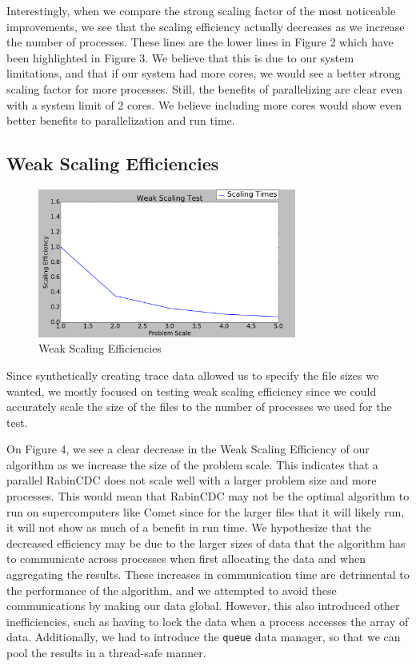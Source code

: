 \documentclass{acmtog} %
\begin{document}
	Interestingly, when we compare the strong scaling factor of the most noticeable improvements, we see that the scaling efficiency actually decreases as we increase the number of processes. These lines are the lower lines in Figure 2 which have been highlighted in Figure 3. We believe that this is due to our system limitations, and that if our system had more cores, we would see a better strong scaling factor for more processes. Still, the benefits of parallelizing are clear even with a system limit of 2 cores. We believe including more cores would show even better benefits to parallelization and run time. 
	
	\subsection{Weak Scaling Efficiencies}
		\begin{figure}
			\centerline{\includegraphics[width=8.5cm]{img/WeakScalingOnly}}
			\caption{Weak Scaling Efficiencies}
			\label{fig:weakscaleonly}
		\end{figure}

	Since synthetically creating trace data allowed us to specify the file sizes we wanted, we mostly focused on testing weak scaling efficiency since we could accurately scale the size of the files to the number of processes we used for the test. 
	
	On Figure 4, we see a clear decrease in the Weak Scaling Efficiency of our algorithm as we increase the size of the problem scale. This indicates that a parallel RabinCDC does not scale well with a larger problem size and more processes. This would mean that RabinCDC may not be the optimal algorithm to run on supercomputers like Comet since for the larger files that it will likely run, it will not show as much of a benefit in run time. We hypothesize that the decreased efficiency may be due to the larger sizes of data that the algorithm has to communicate across processes when first allocating the data and when aggregating the results. These increases in communication time are detrimental to the performance of the algorithm, and we attempted to avoid these communications by making our data global. However, this also introduced other inefficiencies, such as having to lock the data when a process accesses the array of data. Additionally, we had to introduce the \texttt{queue} data manager, so that we can pool the results in a thread-safe manner. 
	
\end{document}
